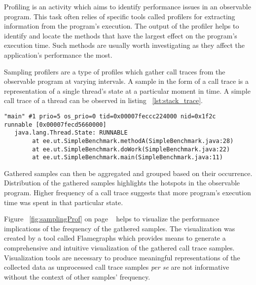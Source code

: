 \documentclass[..thesis.tex]{subfiles}
\begin{document}
Profiling is an activity which aims to identify performance issues in an observable program. This task often relies of specific tools called profilers for extracting information from the program's execution. The output of the profiler helps to identify and locate the methods that have the largest effect on the program's execution time. Such methods are usually worth investigating as they affect the application's performance the most. \cite{mytkowicz_evaluating_2010}

Sampling profilers are a type of profiles which gather call traces from the observable program at varying intervals. A sample in the form of a call trace is a representation of a single thread's state at a particular moment in time. A simple call trace of a thread can be observed in listing ~\ref{lst:stack_trace}.

\begin{lstlisting}[style=def,label={lst:stack_trace}, caption={Call trace of a thread}]
"main" #1 prio=5 os_prio=0 tid=0x00007feccc224000 nid=0x1f2c 
runnable [0x00007fecd5660000]
   java.lang.Thread.State: RUNNABLE
	    at ee.ut.SimpleBenchmark.methodA(SimpleBenchmark.java:28)
    	at ee.ut.SimpleBenchmark.doWork(SimpleBenchmark.java:22)
	    at ee.ut.SimpleBenchmark.main(SimpleBenchmark.java:11)
\end{lstlisting}

Gathered samples can then be aggregated and grouped based on their occurrence.
Distribution of the gathered samples highlights the hotspots in the observable program. Higher frequency of a call trace suggests that more program's execution time was spent in that particular state. 



Figure ~\ref{fig:samplingProf} on page ~\pageref{fig:samplingProf} helps to visualize the performance implications of the frequency of the gathered samples. The visualization was created by a tool called Flamegraphs which provides means to generate a comprehensive and intuitive visualization of the gathered call trace samples. Visualization tools are necessary to produce meaningful representations of the collected data as unprocessed call trace samples \textit{per se} are not informative without the context of other samples' frequency.
\end{document}

